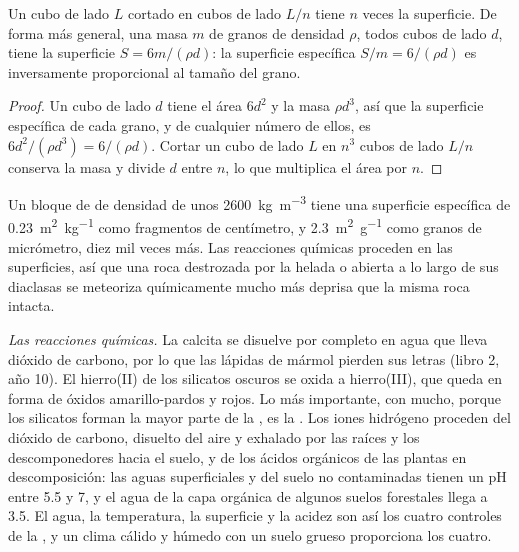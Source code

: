 \begin{proposition}\label{prop:b1:weathering-clays:surface}
Un cubo de lado $L$ cortado en cubos de lado $L/n$ tiene $n$ veces la superficie. De forma más general, una masa $m$ de granos de
densidad $\rho$, todos cubos de lado $d$, tiene la superficie $S = 6m/(\rho d)$: la superficie específica $S/m =
6/(\rho d)$ es inversamente proporcional al tamaño del grano.
\end{proposition}

\begin{proof}
Un cubo de lado $d$ tiene el área $6d^2$ y la masa $\rho d^3$, así que la superficie específica de cada grano, y de cualquier número de ellos, es $6d^2/(\rho d^3)
= 6/(\rho d)$. Cortar un cubo de lado $L$ en $n^3$ cubos de lado $L/n$ conserva la masa y divide $d$ entre $n$, lo que multiplica el área por $n$.
\end{proof}

Un bloque de  de densidad de unos \qty{2600}{kg.m^{-3}} tiene una superficie específica de \qty{0.23}{m^2.kg^{-1}} como fragmentos de
centímetro, y \qty{2.3}{m^2.g^{-1}} como granos de micrómetro, diez mil veces más. Las reacciones químicas proceden en las superficies, así que
una roca destrozada por la helada o abierta a lo largo de sus diaclasas se meteoriza químicamente mucho más deprisa que la misma roca intacta.

\emph{Las reacciones químicas.} La calcita se disuelve por completo en agua que lleva dióxido de carbono, por lo que las lápidas de mármol
pierden sus letras (libro 2, año 10). El hierro(II) de los silicatos oscuros se oxida a hierro(III), que queda en forma de óxidos amarillo-pardos
y rojos. Lo más importante, con mucho, porque los silicatos forman la mayor parte de la , es la . Los iones hidrógeno
proceden del dióxido de carbono, disuelto del aire y exhalado por las raíces y los descomponedores hacia el suelo, y de los ácidos
orgánicos de las plantas en descomposición: las aguas superficiales y del suelo no contaminadas tienen un pH entre 5.5 y 7, y el agua de
la capa orgánica de algunos suelos forestales llega a 3.5. El agua, la temperatura, la superficie y la acidez son así los cuatro controles
de la , y un clima cálido y húmedo con un suelo grueso proporciona los cuatro.

